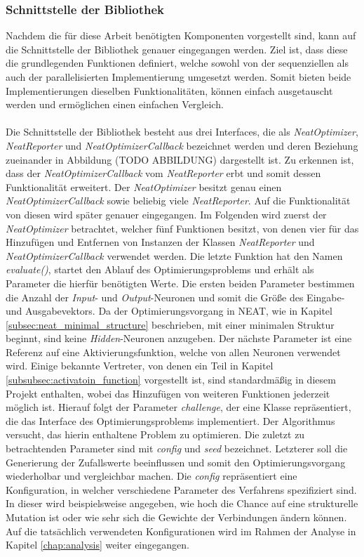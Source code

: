 \subsubsection{Schnittstelle der Bibliothek}
\label{subsubsec:library_interface}
Nachdem die für diese Arbeit benötigten Komponenten vorgestellt sind, kann auf die Schnittstelle der Bibliothek genauer eingegangen werden. Ziel ist, dass diese die grundlegenden Funktionen definiert, welche sowohl von der sequenziellen als auch der parallelisierten Implementierung umgesetzt werden. Somit bieten beide Implementierungen dieselben Funktionalitäten, können einfach ausgetauscht werden und ermöglichen einen einfachen Vergleich. 
\\\\ %
Die Schnittstelle der Bibliothek besteht aus drei Interfaces, die als \emph{NeatOptimizer}, \emph{NeatReporter} und \emph{NeatOptimizerCallback} bezeichnet werden und deren Beziehung zueinander in Abbildung (TODO ABBILDUNG) dargestellt ist. Zu erkennen ist, dass der \emph{NeatOptimizerCallback} vom \emph{NeatReporter} erbt und somit dessen Funktionalität erweitert. Der \emph{NeatOptimizer} besitzt genau einen \emph{NeatOptimizerCallback} sowie beliebig viele \emph{NeatReporter}. Auf die Funktionalität von diesen wird später genauer eingegangen. Im Folgenden wird zuerst der \emph{NeatOptimizer} betrachtet, welcher fünf Funktionen besitzt, von denen vier für das Hinzufügen und Entfernen von Instanzen der Klassen \emph{NeatReporter} und \emph{NeatOptimizerCallback} verwendet werden. Die letzte Funktion hat den Namen \emph{evaluate()}, startet den Ablauf des Optimierungsproblems und erhält als Parameter die hierfür benötigten Werte. Die ersten beiden Parameter bestimmen die Anzahl der \emph{Input}- und \emph{Output}-Neuronen und somit die Größe des Eingabe- und Ausgabevektors. Da der Optimierungsvorgang in \ac{NEAT}, wie in Kapitel \ref{subsec:neat_minimal_structure}  beschrieben, mit einer minimalen Struktur beginnt, sind keine \emph{Hidden}-Neuronen anzugeben. Der nächste Parameter ist eine Referenz auf eine Aktivierungsfunktion, welche von allen Neuronen verwendet wird. Einige bekannte Vertreter, von denen ein Teil in Kapitel \ref{subsubsec:activatoin_function} vorgestellt ist, sind standardmäßig in diesem Projekt enthalten, wobei das Hinzufügen von weiteren Funktionen jederzeit möglich ist. Hierauf folgt der Parameter \emph{challenge}, der eine Klasse repräsentiert, die das Interface des Optimierungsproblems implementiert. Der Algorithmus versucht, das hierin enthaltene Problem zu optimieren. Die zuletzt zu betrachtenden Parameter sind mit \emph{config} und \emph{seed} bezeichnet. Letzterer soll die Generierung der Zufallswerte beeinflussen und somit den Optimierungsvorgang wiederholbar und vergleichbar machen. Die \emph{config} repräsentiert eine Konfiguration, in welcher verschiedene Parameter des Verfahrens spezifiziert sind. In dieser wird beispielsweise angegeben, wie hoch die Chance auf eine strukturelle Mutation ist oder wie sehr sich die Gewichte der Verbindungen ändern können. Auf die tatsächlich verwendeten Konfigurationen wird im Rahmen der Analyse in Kapitel \ref{chap:analysis} weiter eingegangen.
